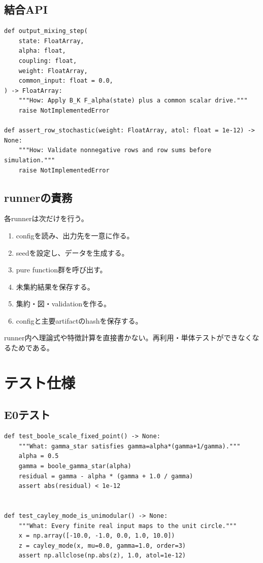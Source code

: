 \documentclass[a4paper,11pt,oneside,openany]{ltjsbook}
\begin{document}
\section{結合API}

\begin{lstlisting}[style=pythonstyle,caption={row-stochastic出力混合のAPI契約。}]
def output_mixing_step(
    state: FloatArray,
    alpha: float,
    coupling: float,
    weight: FloatArray,
    common_input: float = 0.0,
) -> FloatArray:
    """How: Apply B_K F_alpha(state) plus a common scalar drive."""
    raise NotImplementedError

def assert_row_stochastic(weight: FloatArray, atol: float = 1e-12) -> None:
    """How: Validate nonnegative rows and row sums before simulation."""
    raise NotImplementedError
\end{lstlisting}

\section{runnerの責務}

各runnerは次だけを行う。

\begin{enumerate}
  \item configを読み、出力先を一意に作る。
  \item seedを設定し、データを生成する。
  \item pure function群を呼び出す。
  \item 未集約結果を保存する。
  \item 集約・図・validationを作る。
  \item configと主要artifactのhashを保存する。
\end{enumerate}

runner内へ理論式や特徴計算を直接書かない。再利用・単体テストができなくなるためである。

\chapter{テスト仕様}
\label{app:tests}

\section{E0テスト}

\begin{lstlisting}[style=pythonstyle,caption={理論整合性テストの例。}]
def test_boole_scale_fixed_point() -> None:
    """What: gamma_star satisfies gamma=alpha*(gamma+1/gamma)."""
    alpha = 0.5
    gamma = boole_gamma_star(alpha)
    residual = gamma - alpha * (gamma + 1.0 / gamma)
    assert abs(residual) < 1e-12


def test_cayley_mode_is_unimodular() -> None:
    """What: Every finite real input maps to the unit circle."""
    x = np.array([-10.0, -1.0, 0.0, 1.0, 10.0])
    z = cayley_mode(x, mu=0.0, gamma=1.0, order=3)
    assert np.allclose(np.abs(z), 1.0, atol=1e-12)
\end{lstlisting}
\end{document}
